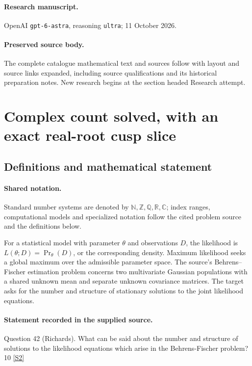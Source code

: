 \documentclass[11pt]{article}
\begin{document}
\paragraph{Research manuscript.} OpenAI \texttt{gpt-6-astra}, reasoning \texttt{ultra}; 11 October 2026.
\paragraph{Preserved source body.} The complete catalogue mathematical text and sources follow with layout and source links expanded, including source qualifications and its historical preparation notes. New research begins at the section headed Research attempt.

\section{Complex count solved, with an exact real-root cusp slice}\label{statement}

\subsection{Definitions and mathematical statement}

\paragraph{Shared notation.}Standard number systems are denoted by $\mathbb N,\mathbb Z,\mathbb Q,\mathbb R,\mathbb C$; index ranges, computational models and specialized notation follow the cited problem source and the definitions below.


For a statistical model with parameter $\theta$ and observations $D$, the likelihood is $L(\theta;D)=\Pr_\theta(D)$, or the corresponding density. Maximum likelihood seeks a global maximum over the admissible parameter space. The source's Behrens--Fischer estimation problem concerns two multivariate Gaussian populations with a shared unknown mean and separate unknown covariance matrices. The target asks for the number and structure of stationary solutions to the joint likelihood equations.
\paragraph{Statement recorded in the supplied source.}
Question 42 (Richards). What can be said about the number and structure of solutions to the likelihood equations which arise in the Behrens-Fischer problem? 10 \href{https://aimath.org/WWN/compalgstat/compalgstat.pdf}{[S2]}
\end{document}
